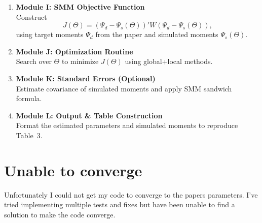 \documentclass[12pt]{article}
\begin{document}
\begin{enumerate}
		\item \textbf{Module I: SMM Objective Function}\\
		Construct 
		\[
		J(\Theta)=\left(\Psi_d - \Psi_s(\Theta)\right)' 
		W \left(\Psi_d - \Psi_s(\Theta)\right),
		\]
		using target moments $\Psi_d$ from the paper and simulated moments 
		$\Psi_s(\Theta)$.
		
		\item \textbf{Module J: Optimization Routine}\\
		Search over $\Theta$ to minimize $J(\Theta)$ using global+local methods.
		
		\item \textbf{Module K: Standard Errors (Optional)}\\
		Estimate covariance of simulated moments and apply SMM sandwich formula.
		
		\item \textbf{Module L: Output \& Table Construction}\\
		Format the estimated parameters and simulated moments to reproduce 
		Table~3.
	\end{enumerate}

	\section*{Unable to converge}
	Unfortunately I could not get my code to converge to the papers parameters.  I've tried implementing multiple tests and fixes but have been unable to find a solution to make the code converge.
\end{document}
